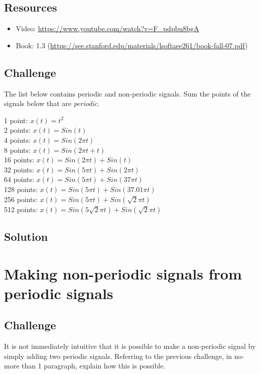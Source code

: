 \subsection*{Resources}
\begin{itemize}
    \item Video: \url{https://www.youtube.com/watch?v=F_pdpbu8bgA}
    \item Book: 1.3 (\url{https://see.stanford.edu/materials/lsoftaee261/book-fall-07.pdf})
\end{itemize}

\subsection*{Challenge}
The list below contains periodic and non-periodic signals. Sum the points of the signals below that are \emph{periodic}.

1 point: $x(t) = t^2$\\
2 points: $x(t) = Sin(t)$\\
4 points: $x(t) = Sin(2 \pi t)$\\
8 points: $x(t) = Sin(2 \pi t + t)$\\
16 points: $x(t) = Sin(2 \pi t) + Sin(t)$\\
32 points: $x(t) = Sin(5 \pi t) + Sin(2 \pi t)$\\
64 points: $x(t) = Sin(5 \pi t) + Sin(37 \pi t)$\\
128 points: $x(t) = Sin(5 \pi t) + Sin(37.01 \pi t)$\\
256 points: $x(t) = Sin(5 \pi t) + Sin(\sqrt{2} \pi t)$\\
512 points: $x(t) = Sin(5 \sqrt{2} \pi t) + Sin(\sqrt{2} \pi t)$

\subsection*{Solution}




\newpage
\section{Making non-periodic signals from periodic signals}

\subsection*{Challenge}
It is not immediately intuitive that it is possible to make a non-periodic signal by simply adding two periodic signals. Referring to the previous challenge, in no-more than 1 paragraph, explain how this is possible.

